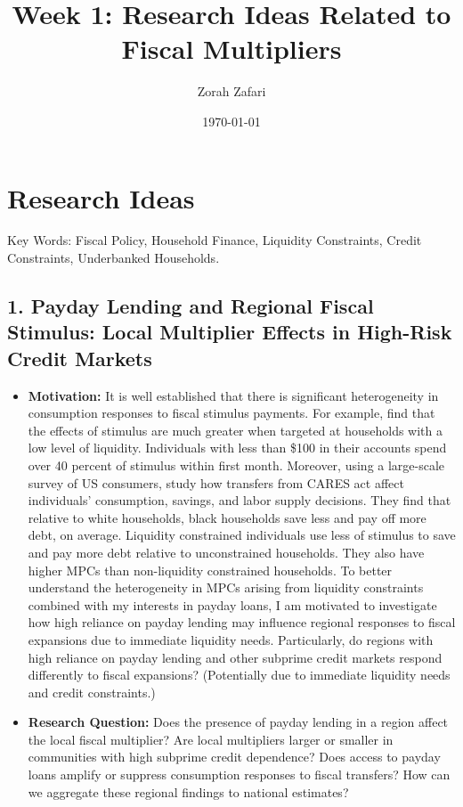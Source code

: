 \documentclass[10pt]{article}
\title{Week 1: Research Ideas Related to Fiscal Multipliers}
\author{Zorah Zafari}
\date{\today}
\begin{document}
\maketitle


\section*{Research Ideas}
Key Words: Fiscal Policy, Household Finance, Liquidity Constraints, Credit Constraints, Underbanked Households. 


\subsection*{1. Payday Lending and Regional Fiscal Stimulus: Local Multiplier Effects in High-Risk Credit Markets}
\begin{itemize}
\item \textbf{Motivation:} It is well established that there is significant heterogeneity in consumption responses to fiscal stimulus payments. For example, \citet{bakeretall} find that the effects of stimulus are much greater when targeted at households with a low level of liquidity. Individuals with less than \$100 in their accounts spend over 40 percent of stimulus within first month. Moreover, using a large-scale survey of US consumers, \citet{Coinbon} study how transfers from CARES act affect individuals' consumption, savings, and labor supply decisions. They find that relative to white households, black households save less and pay off more debt, on average. Liquidity constrained individuals use less of stimulus to save and pay more debt relative to unconstrained households. They also have higher MPCs than non-liquidity constrained households. To better understand the heterogeneity in MPCs arising from liquidity constraints combined with my interests in payday loans, I am motivated to investigate how high reliance on payday lending may influence regional responses to fiscal expansions due to immediate liquidity needs. Particularly, do regions with high reliance on payday lending and other subprime credit markets respond differently to fiscal expansions? (Potentially due to immediate liquidity needs and credit constraints.)
\item \textbf{Research Question:} Does the presence of payday lending in a region affect the local fiscal multiplier? Are local multipliers larger or smaller in communities with high subprime credit dependence? Does access to payday loans amplify or suppress consumption responses to fiscal transfers? How can we aggregate these regional findings to national estimates? 

\end{itemize}
\end{document}
